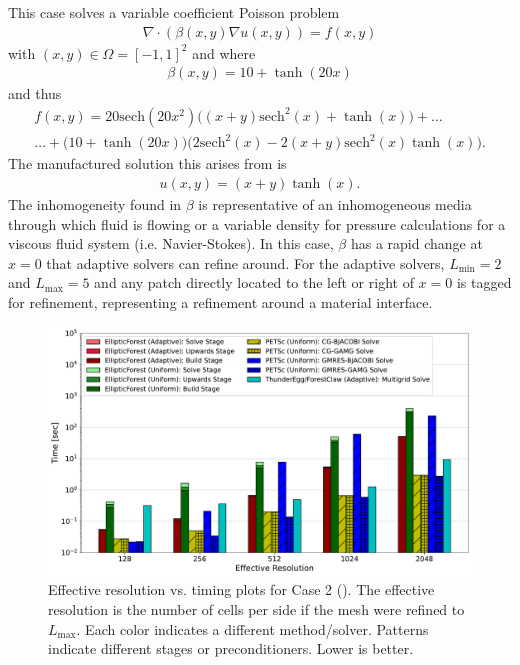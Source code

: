 This case solves a variable coefficient Poisson problem
\begin{align}
    \nabla \cdot \left( \beta(x,y) \nabla u(x,y) \right) = f(x,y)
    \label{eq:case02-variable-poisson}
\end{align}
with $(x,y) \in \Omega = [-1,1]^2$ and where
\begin{align}
    \beta(x,y) = 10 + \tanh(20 x)
\end{align}
and thus
\begin{align}
    f(x,y) = 20\text{sech}(20x^2) \Big((x + y)\text{sech}^2(x) + \tanh(x)\Big) + \dots\\
    \dots + \big(10 + \tanh(20 x)\big) \Big(2 \text{sech}^2(x) - 2(x + y)\text{sech}^2(x) \tanh(x)\Big).
\end{align}
The manufactured solution this arises from is
\begin{align}
    u(x,y) = (x + y) \tanh(x).
\end{align}
The inhomogeneity found in $\beta$ is representative of an inhomogeneous media through which fluid is flowing or a variable density for pressure calculations for a viscous fluid system (i.e. Navier-Stokes). In this case, $\beta$ has a rapid change at $x = 0$ that adaptive solvers can refine around. For the adaptive solvers, $L_{\text{min}} = 2$ and $L_{\text{max}} = 5$ and any patch directly located to the left or right of $x = 0$ is tagged for refinement, representing a refinement around a material interface.

    \begin{figure}
        \centering
        \includegraphics[width=1.0\textwidth, clip=true, trim={0 0 0 0}]{figures/case02-stacked-bar-plot-comparisons-no-title.pdf}
        \caption{Effective resolution vs. timing plots for Case 2 (). The effective resolution is the number of cells per side if the mesh were refined to $L_{\text{max}}$. Each color indicates a different method/solver. Patterns indicate different stages or preconditioners. Lower is better.}
        \label{fig:case02-stacked-bar-plot}
    \end{figure}

